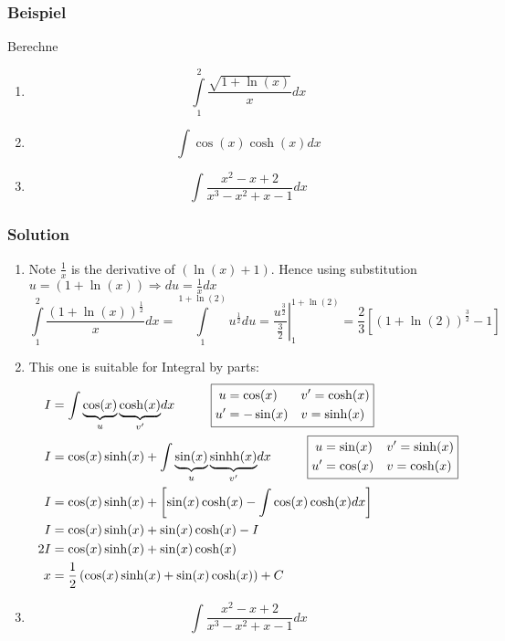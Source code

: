 \documentclass[a4paper]{article}
\begin{document}
\subsubsection*{Beispiel}
Berechne 
\begin{enumerate}
\item \[\int\limits_1^2\frac{\sqrt{1+\ln(x)}}{x}dx\]
\item \[\int \cos(x)\cosh(x) dx\]
\item \[\int\frac{x^2-x+2}{x^3-x^2+x-1}dx\]
\end{enumerate}
\subsubsection*{Solution}
\begin{enumerate}
\item Note $\frac{1}{x}$ is the derivative of $\left( \ln(x)+1\right)$. Hence using substitution $u=\left( 1+\ln(x)\right)\Rightarrow du = \frac{1}{x}dx$
\[\int\limits_1^2 \frac{\left( 1+\ln(x)\right)^{\frac{1}{2}}}{x}dx=\int\limits_1^{1+\ln(2)} u^{\frac{1}{2}}du = \left.\frac{u^{\frac{3}{2}}}{\frac{3}{2}}\right|^{1+\ln(2)}_1=\frac{2}{3}\left[  \left(1+\ln(2)\right)^{\frac{3}{2}}-1\right]\]
\item This one is suitable for Integral by parts:
\begin{align*}
I &= \int {\underbrace {\cos (x)}_u\underbrace {\cosh (x)}_{v'}} dx\hspace{10mm}
\boxed{\begin{aligned}
u &= \cos (x)  	&&v'=  \cosh (x)\\
u' &=  - \sin (x)  &&v= \sinh (x)
\end{aligned}}\\
I &= \cos (x)\sinh (x) + \int {\underbrace {\sin (x)}_u\underbrace {{\mathop{\rm sinhh}\nolimits} (x)}_{v'}} dx\hspace{10mm}
\boxed{\begin{aligned}
u &= \sin (x)  	&&v'=  \sinh (x)\\
u' &=  \cos (x)  &&v= \cosh (x)
\end{aligned}}\\
I &=\cos(x)\sinh(x)+\left[ \sin(x)\cosh(x) - \int \cos(x)\cosh(x) dx\right]\\
I&=\cos(x)\sinh(x)+\sin(x)\cosh(x)-I\\
2I&=\cos(x)\sinh(x)+\sin(x)\cosh(x)\\
x&=\frac{1}{2}\left( \cos(x)\sinh(x)+\sin(x)\cosh(x)\right) + C
\end{align*}
\item \[\int\frac{x^2-x+2}{x^3-x^2+x-1}dx\]

\end{enumerate}
\end{document}
